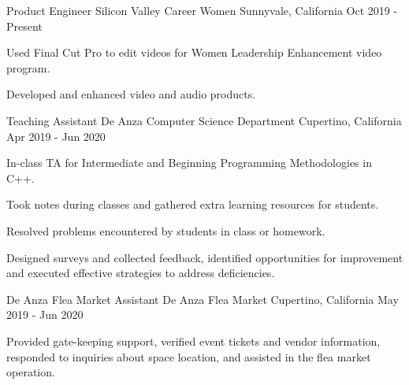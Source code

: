

\begin{cventries}

  \cventry
    {Product Engineer} %
    {Silicon Valley Career Women} %
    {Sunnyvale, California} %
    {Oct 2019 - Present} %
    {
	\begin{cvitems} %
      	\item Used Final Cut Pro to edit videos for Women Leadership Enhancement video program.
      	\item Developed and enhanced video and audio products.
	\end{cvitems}
    }
    
  \cventry
    {Teaching Assistant} %
    {De Anza Computer Science Department} %
    {Cupertino, California} %
    {Apr 2019 - Jun 2020} %
    {
	\begin{cvitems} %
      	\item In-class TA for Intermediate and Beginning Programming Methodologies in C++.
		\item Took notes during classes and gathered extra learning resources for students.       
      	\item Resolved problems encountered by students in class or homework.
      	\item Designed surveys and collected feedback, identified opportunities for improvement and executed effective strategies to address deficiencies.
	\end{cvitems}
    }
    
  \cventry
    {De Anza Flea Market Assistant} %
    {De Anza Flea Market} %
    {Cupertino, California} %
    {May 2019 - Jun 2020} %
    {
	\begin{cvitems} %
      	\item Provided gate-keeping support, verified event tickets and vendor information, responded to inquiries about space location, and assisted in the flea market operation.
	\end{cvitems}
    }
	  

\end{cventries}
